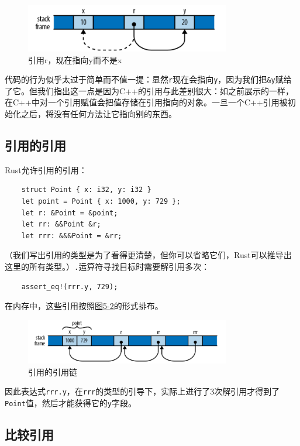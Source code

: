 \begin{figure}[htbp]
    \centering
    \includegraphics[width=0.8\textwidth]{../img/f5-1.png}
    \caption{引用r，现在指向y而不是x}
    \label{f5-1}
\end{figure}

代码的行为似乎太过于简单而不值一提：显然\texttt{r}现在会指向\texttt{y}，因为我们把\texttt{\&y}赋给了它。但我们指出这一点是因为C++的引用与此差别很大：如之前展示的一样，在C++中对一个引用赋值会把值存储在引用指向的对象。一旦一个C++引用被初始化之后，将没有任何方法让它指向别的东西。

\subsection{引用的引用}
Rust允许引用的引用：
\begin{verbatim}
    struct Point { x: i32, y: i32 }
    let point = Point { x: 1000, y: 729 };
    let r: &Point = &point;
    let rr: &&Point &r;
    let rrr: &&&Point = &rr;
\end{verbatim}

（我们写出引用的类型是为了看得更清楚，但你可以省略它们，Rust可以推导出这里的所有类型。）\texttt{.}运算符寻找目标时需要解引用多次：
\begin{verbatim}
    assert_eq!(rrr.y, 729);
\end{verbatim}

在内存中，这些引用按照\hyperref[f5-2]{图5-2}的形式排布。

\begin{figure}[htbp]
    \centering
    \includegraphics[width=0.8\textwidth]{../img/f5-2.png}
    \caption{引用的引用链}
    \label{f5-2}
\end{figure}

因此表达式\texttt{rrr.y}，在\texttt{rrr}的类型的引导下，实际上进行了3次解引用才得到了\texttt{Point}值，然后才能获得它的\texttt{y}字段。

\subsection{比较引用}











